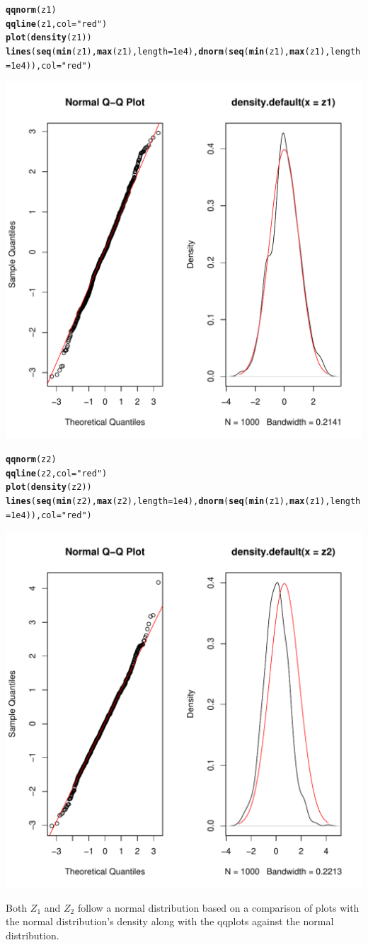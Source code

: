 \documentclass{article}\usepackage[]{graphicx}\usepackage[]{color}
\makeatletter
\newcommand{\hlnum}[1]{\textcolor[rgb]{0.686,0.059,0.569}{#1}}%
\newcommand{\hlstr}[1]{\textcolor[rgb]{0.192,0.494,0.8}{#1}}%
\newcommand{\hlstd}[1]{\textcolor[rgb]{0.345,0.345,0.345}{#1}}%
\newcommand{\hlkwc}[1]{\textcolor[rgb]{0.333,0.667,0.333}{#1}}%
\newcommand{\hlkwd}[1]{\textcolor[rgb]{0.737,0.353,0.396}{\textbf{#1}}}%
\newenvironment{kframe}{%
 \def\at@end@of@kframe{}%
 \ifinner\ifhmode%
  \def\at@end@of@kframe{\end{minipage}}%
  \begin{minipage}{\columnwidth}%
 \fi\fi%
 \def\FrameCommand##1{\hskip\@totalleftmargin \hskip-\fboxsep
 \colorbox{shadecolor}{##1}\hskip-\fboxsep
     \hskip-\linewidth \hskip-\@totalleftmargin \hskip\columnwidth}%
 \MakeFramed {\advance\hsize-\width
   \@totalleftmargin\z@ \linewidth\hsize
   \@setminipage}}%
 {\par\unskip\endMakeFramed%
 \at@end@of@kframe}
\newenvironment{knitrout}{}{} %
\makeatother
\begin{document}
\begin{knitrout}
\begin{kframe}
\begin{alltt}
\hlkwd{qqnorm}\hlstd{(z1)}
\hlkwd{qqline}\hlstd{(z1,} \hlkwc{col} \hlstd{=} \hlstr{"red"}\hlstd{)}
\hlkwd{plot}\hlstd{(}\hlkwd{density}\hlstd{(z1))}
\hlkwd{lines}\hlstd{(}\hlkwd{seq}\hlstd{(}\hlkwd{min}\hlstd{(z1),}\hlkwd{max}\hlstd{(z1),} \hlkwc{length} \hlstd{=} \hlnum{1e4}\hlstd{),} \hlkwd{dnorm}\hlstd{(}\hlkwd{seq}\hlstd{(}\hlkwd{min}\hlstd{(z1),}\hlkwd{max}\hlstd{(z1),} \hlkwc{length} \hlstd{=} \hlnum{1e4}\hlstd{)),} \hlkwc{col} \hlstd{=} \hlstr{"red"}\hlstd{)}
\end{alltt}
\end{kframe}
\includegraphics[width=0.50\linewidth]{figure/unnamed-chunk-5-1} 
\begin{kframe}\begin{alltt}
\hlkwd{qqnorm}\hlstd{(z2)}
\hlkwd{qqline}\hlstd{(z2,} \hlkwc{col} \hlstd{=} \hlstr{"red"}\hlstd{)}
\hlkwd{plot}\hlstd{(}\hlkwd{density}\hlstd{(z2))}
\hlkwd{lines}\hlstd{(}\hlkwd{seq}\hlstd{(}\hlkwd{min}\hlstd{(z2),}\hlkwd{max}\hlstd{(z2),} \hlkwc{length} \hlstd{=} \hlnum{1e4}\hlstd{),} \hlkwd{dnorm}\hlstd{(}\hlkwd{seq}\hlstd{(}\hlkwd{min}\hlstd{(z1),}\hlkwd{max}\hlstd{(z1),} \hlkwc{length} \hlstd{=} \hlnum{1e4}\hlstd{)),} \hlkwc{col} \hlstd{=} \hlstr{"red"}\hlstd{)}
\end{alltt}
\end{kframe}
\includegraphics[width=0.50\linewidth]{figure/unnamed-chunk-5-2} 

\end{knitrout}
Both $Z_1$ and $Z_2$ follow a normal distribution based on a comparison of plots with the normal distribution's density along with the qqplots against the normal distribution. 
\end{document}
